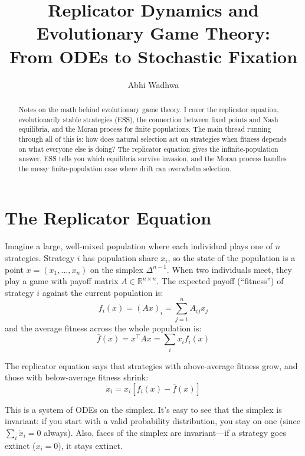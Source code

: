 \documentclass[11pt]{article}
\title{Replicator Dynamics and Evolutionary Game Theory:\\From ODEs to Stochastic Fixation}
\author{Abhi Wadhwa}
\date{}
\begin{document}
\maketitle

\begin{abstract}
Notes on the math behind evolutionary game theory. I cover the replicator equation, evolutionarily stable strategies (ESS), the connection between fixed points and Nash equilibria, and the Moran process for finite populations. The main thread running through all of this is: how does natural selection act on strategies when fitness depends on what everyone else is doing? The replicator equation gives the infinite-population answer, ESS tells you which equilibria survive invasion, and the Moran process handles the messy finite-population case where drift can overwhelm selection.
\end{abstract}

\section{The Replicator Equation}

Imagine a large, well-mixed population where each individual plays one of $n$ strategies. Strategy $i$ has population share $x_i$, so the state of the population is a point $x = (x_1, \ldots, x_n)$ on the simplex $\Delta^{n-1}$. When two individuals meet, they play a game with payoff matrix $A \in \mathbb{R}^{n \times n}$. The expected payoff (``fitness'') of strategy $i$ against the current population is:
\begin{equation}
    f_i(x) = (Ax)_i = \sum_{j=1}^{n} A_{ij} x_j
\end{equation}
and the average fitness across the whole population is:
\begin{equation}
    \bar{f}(x) = x^\top A x = \sum_{i} x_i f_i(x)
\end{equation}

The replicator equation says that strategies with above-average fitness grow, and those with below-average fitness shrink:
\begin{equation}
    \dot{x}_i = x_i \left[ f_i(x) - \bar{f}(x) \right]
\end{equation}

This is a system of ODEs on the simplex. It's easy to see that the simplex is invariant: if you start with a valid probability distribution, you stay on one (since $\sum_i \dot{x}_i = 0$ always). Also, faces of the simplex are invariant---if a strategy goes extinct ($x_i = 0$), it stays extinct.
\end{document}
